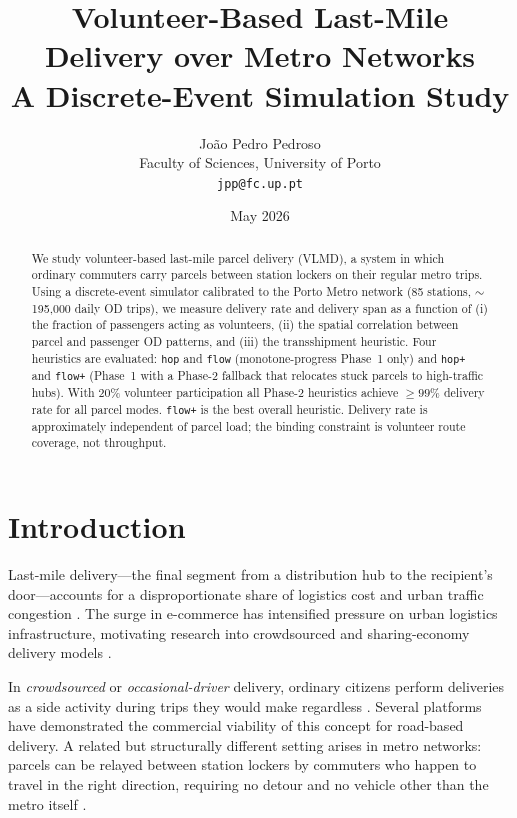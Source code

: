 \documentclass[11pt,a4paper]{article}
\title{\textbf{Volunteer-Based Last-Mile Delivery over Metro Networks}\\
       \large A Discrete-Event Simulation Study}
\author{João Pedro Pedroso\\
        \small Faculty of Sciences, University of Porto\\
        \small \texttt{jpp@fc.up.pt}}
\date{May 2026}
\begin{document}
\maketitle

\begin{abstract}
We study volunteer-based last-mile parcel delivery (VLMD), a system in which
ordinary commuters carry parcels between station lockers on their regular metro
trips. Using a discrete-event simulator calibrated to the Porto Metro network
(85 stations, $\sim$195{,}000 daily OD trips), we measure delivery rate and
delivery span as a function of (i) the fraction of passengers acting as
volunteers, (ii) the spatial correlation between parcel and passenger OD
patterns, and (iii) the transshipment heuristic. Four heuristics are evaluated:
\texttt{hop} and \texttt{flow} (monotone-progress Phase~1 only) and
\texttt{hop+} and \texttt{flow+} (Phase~1 with a Phase-2 fallback that
relocates stuck parcels to high-traffic hubs). With 20\% volunteer participation
all Phase-2 heuristics achieve $\geq99\%$ delivery rate for all parcel modes.
\texttt{flow+} is the best overall heuristic.  Delivery rate is approximately
independent of parcel load; the binding constraint is volunteer route coverage,
not throughput.
\end{abstract}

\tableofcontents
\newpage

\section{Introduction}

Last-mile delivery---the final segment from a distribution hub to the
recipient's door---accounts for a disproportionate share of logistics cost and
urban traffic congestion \cite{savelsbergh2016city}. The surge in e-commerce
has intensified pressure on urban logistics infrastructure, motivating
research into crowdsourced and sharing-economy delivery models
\cite{sampaio2019crowd}.

In \emph{crowdsourced} or \emph{occasional-driver} delivery, ordinary
citizens perform deliveries as a side activity during trips they would make
regardless \cite{archetti2016vrp}. Several platforms have demonstrated the
commercial viability of this concept for road-based delivery. A related but
structurally different setting arises in metro networks: parcels can be
relayed between station lockers by commuters who happen to travel in the
right direction, requiring no detour and no vehicle other than the metro
itself \cite{kafle2017crowdsource}.
\end{document}
